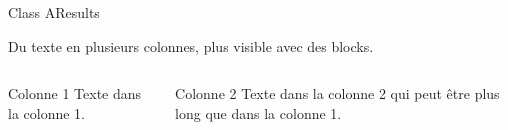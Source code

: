 \begin{frame}{Class A}{Results}


Du texte en plusieurs colonnes, plus visible avec des blocks.

	\begin{columns}[t]
	 
		  \begin{column}{5cm}
			  \begin{block}{Colonne 1} 
			  	Texte dans la colonne 1.
			  \end{block} 
		  \end{column}
	  
		  \begin{column}{5cm}
			  \begin{block}{Colonne 2}
			    Texte dans la colonne 2 qui peut être plus long que dans la colonne 1.
			  \end{block}   
		  \end{column}
		  
	\end{columns}  

\end{frame}

